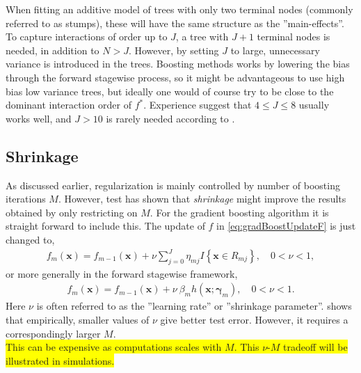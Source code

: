 When fitting an additive model of trees with only two terminal nodes (commonly referred to as stumps), these will have the same structure as the ''main-effects''. To capture interactions of order up to $J$, a tree with $J+1$  terminal nodes is needed, in addition to $N>J$. However, by setting $J$ to large, unnecessary variance is introduced in the trees. Boosting methods works by lowering the bias through the forward stagewise process, so it might be advantageous to use high bias low variance trees, but ideally one would of course try to be close to the dominant interaction order of $f^*$.
Experience suggest that $4 \leq J \leq 8$ usually works well, and $J>10$ is rarely needed according to \cite{modstat}.  

\subsection{Shrinkage}
\label{sub:Shrinkage}
As discussed earlier, regularization is mainly controlled by number of boosting iterations $M$. However, test has shown  \cite{copas1983} that \textit{shrinkage} might improve the results obtained by only restricting on $M$. For the gradient boosting algorithm it is straight forward to include this. 
The update of $f$ in \eqref{eq:gradBoostUpdateF} is just changed to,
\begin{align}
  f_m(\mathbf{x}) = f_{m-1}(\mathbf{x}) +  \nu \sum^{J}_{j=0} \eta_{m j} I\left\{ \mathbf{x} \in R_{m j} \right\}, \quad 0 < \nu < 1,
\end{align}
or more generally in the forward stagewise framework,
\begin{align}
  f_m(\mathbf{x}) = f_{m-1}(\mathbf{x}) +  \nu \: \beta_m h(\mathbf{x}; \bm \gamma_m), \quad 0 < \nu < 1.
\end{align}
Here $\nu$ is often referred to as the ''learning rate'' or ''shrinkage parameter''. \cite{friedman} shows that empirically, smaller values of $\nu$ give better test error. However, it requires a correspondingly larger $M$. 
\\\colorbox{yellow}{This can be expensive as computations scales with $M$. This $\nu$-$M$ tradeoff will be illustrated in simulations.}


